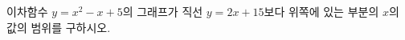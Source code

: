 \hspace*{2mm}\begin{minipage}[t]{\dimexpr\linewidth-2mm\relax}\vspace{0pt}
이차함수 $y=x^2-x+5$의 그래프가 직선 $y=2x+15$보다 위쪽에 있는 부분의 $x$의 값의 범위를 구하시오.\end{minipage}
